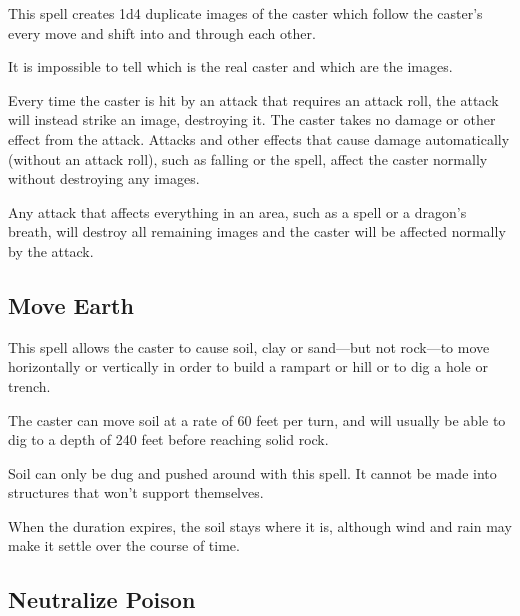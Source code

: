 \begin{multicols*}{2}
This spell creates 1d4 duplicate images of the caster which follow the caster’s every move and shift into and through each other.

It is impossible to tell which is the real caster and which are the images.

Every time the caster is hit by an attack that requires an attack roll, the attack will instead strike an image, destroying it. The caster takes no damage or other effect from the attack. Attacks and other effects that cause damage automatically (without an attack roll), such as falling or the  spell, affect the caster normally without destroying any images.

Any attack that affects everything in an area, such as a  spell or a dragon’s breath, will destroy all remaining images and the caster will be affected normally by the attack.

\subsection{Move Earth}\label{spell:Move Earth}

This spell allows the caster to cause soil, clay or sand—but not rock—to move horizontally or vertically in order to build a rampart or hill or to dig a hole or trench.

The caster can move soil at a rate of 60 feet per turn, and will usually be able to dig to a depth of 240 feet before reaching solid rock.

Soil can only be dug and pushed around with this spell. It cannot be made into structures that won’t support themselves.

When the duration expires, the soil stays where it is, although wind and rain may make it settle over the course of time.

\subsection{Neutralize Poison}\label{spell:Neutralize Poison}
\end{multicols*}
